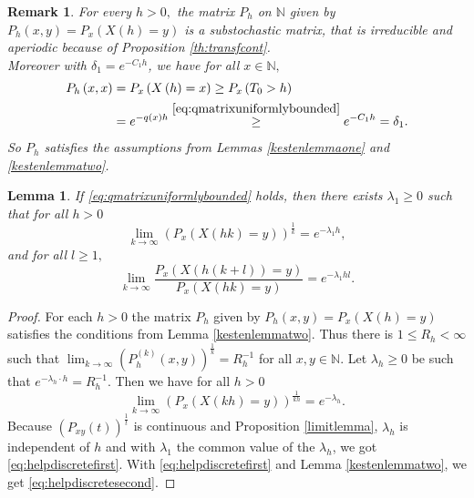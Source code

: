 \documentclass[12pt,a4paper]{scrartcl}
\newtheorem{lemma}[theorem]{Lemma}
\newtheorem {remark}[theorem]{Remark}
\numberwithin{equation}{section}
\newcommand{\N}{\mathbb{N}} %
\begin{document}
\begin{remark}
For every $h > 0,$ the matrix $P_h$ on $\N$ given by $P_h\left(x,y\right) = P_x\left(X\left(h\right)=y \right)$ is a substochastic matrix, that is irreducible and aperiodic because of Proposition \ref{th:transfcont}.\\
Moreover with $\delta_1 = e^{-C_1 h}$, we have for all $x \in \N,$
\begin{align*}
P_h\left(x,x\right) &= P_x\left(X\left(h\right)=x \right) \geq P_x\left(T_0 > h \right) \\
&= e^{-q\left(x\right)h} \overset{\eqref{eq:qmatrixuniformlybounded}}{\geq} e^{-C_1 h} = \delta_1.
\end{align*}
So $P_h$ satisfies the assumptions from Lemmas \ref{kestenlemmaone} and \ref{kestenlemmatwo}.

\end{remark}


\begin{lemma} \label{th:thelimitsdiscrete}
If \eqref{eq:qmatrixuniformlybounded} holds, then there exists $\lambda_1 \geq 0$ such that for all $h > 0$
\begin{equation} \label{eq:helpdiscretefirst}
\lim_{k \to \infty} \left(P_x\left(X\left(hk\right)=y \right) \right)^{\frac{1}{k}} = e^{-\lambda_1 h},
\end{equation}
and for all $l \geq 1,$
\begin{equation} \label{eq:helpdiscretesecond}
\lim_{k \to \infty} \frac{P_x\left(X\left(h\left(k+l\right)\right)=y\right)}{P_x\left(X\left(hk\right)=y\right)} = e^{-\lambda_1 h l}.
\end{equation} 
\end{lemma}
\begin{proof}
For each $h >0$ the matrix $P_h$ given by $P_h\left(x,y\right) = P_x\left(X\left(h\right) = y\right)$ satisfies the conditions from Lemma \ref{kestenlemmatwo}. Thus there is $1 \leq R_h < \infty$ such that $\lim_{k \to \infty}  \left(P_h^{\left(k\right)}\left(x,y\right)\right)^{\frac{1}{k}} = R_h^{-1}$ for all $x,y \in \N$. Let $\lambda_h \geq 0$ be such that $e^{-\lambda_h \cdot h} = R_h^{-1}. $ Then we have for all $ h > 0$
$$ \lim_{k \to \infty} \left(P_x\left(X\left(kh \right)=y \right) \right)^{\frac{1}{kh}} = e^{-\lambda_h}. $$
Because $\left(P_{xy}\left(t\right)\right)^{\frac{1}{t}}$ is continuous and Proposition \ref{limitlemma}, $\lambda_h$ is independent of $h$ and with $\lambda_1$ the common value of the $\lambda_h$, we got \eqref{eq:helpdiscretefirst}.
With \eqref{eq:helpdiscretefirst} and Lemma \ref{kestenlemmatwo}, we get \eqref{eq:helpdiscretesecond}.


\end{proof}
\end{document}

